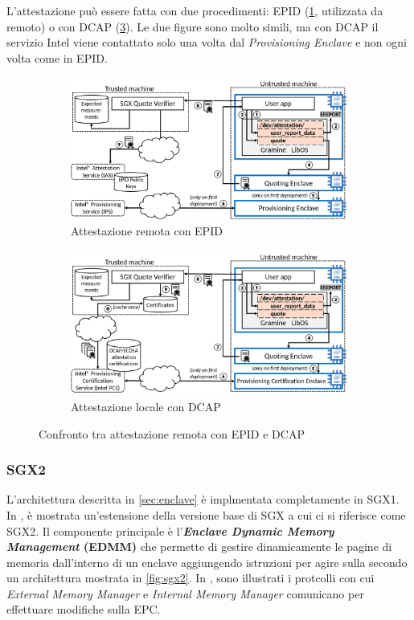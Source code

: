 \documentclass{article}
\begin{document}
L'attestazione può essere fatta con due procedimenti: EPID (\cref{fig:ra-epid}, utilizzata da remoto) o con DCAP (\cref{fig:ra-dcap}). Le due figure sono molto simili, ma con DCAP il servizio Intel viene contattato solo una volta dal \textit{Provisioning Enclave} e non ogni volta come in EPID. 

\begin{figure}[h]
\centering
\begin{subfigure}{.5\textwidth}
  \centering
  \includegraphics[width=.95\textwidth]{./figures/ch1/ra-sgx-epid.png}
  \caption{Attestazione remota con EPID}\label{fig:ra-epid}
\end{subfigure}%
\begin{subfigure}{.5\textwidth}
  \centering
    \includegraphics[width=.95\textwidth]{./figures/ch1/ra-sgx-dcap.png}
  \caption{Attestazione locale con DCAP}\label{fig:ra-dcap}
\end{subfigure}
\caption{Confronto tra attestazione remota con EPID e DCAP}
\end{figure}

\subsubsection{SGX2}
L'architettura descritta in \cref{sec:enclave} è implmentata completamente in SGX1. In \cite{10.1145/2948618.2954331}, è mostrata un'estensione della versione base di SGX a cui ci si riferisce come SGX2. Il componente principale è l'\textbf{\textit{Enclave Dynamic Memory Management} (EDMM)} che permette di gestire dinamicamente le pagine di memoria dall'interno di un enclave aggiungendo istruzioni per agire sulla secondo un architettura mostrata in \cref{fig:sgx2}. In \cite{10.1145/2948618.2954331}, sono illustrati i protcolli con cui \textit{External Memory Manager} e \textit{Internal Memory Manager} comunicano per effettuare modifiche sulla EPC.
\end{document}
